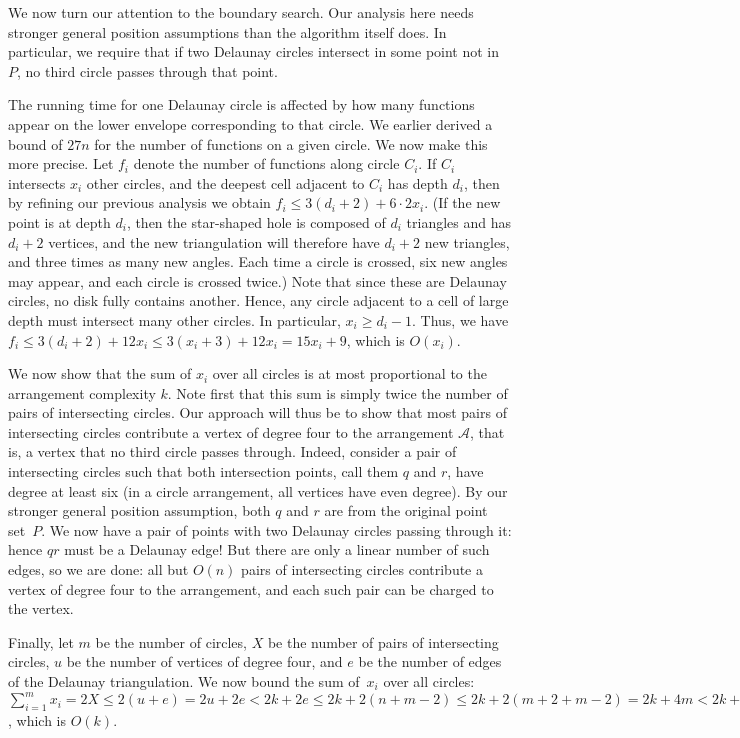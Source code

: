 \documentclass{cccg13}
\newcommand\arr{\mathcal A}
\begin{document}
We now turn our attention to the boundary search.  Our analysis here needs stronger general position assumptions than the algorithm itself does.  In particular, we require that if two Delaunay circles intersect in some point not in $P$, no third circle passes through that point.

The running time for one Delaunay circle is affected by how many functions appear on the lower envelope corresponding to that circle.  We earlier derived a bound of $27n$ for the number of functions on a given circle.  We now make this more precise.  Let $f_i$ denote the number of functions along circle $C_i$.  If $C_i$ intersects $x_i$ other circles, and the deepest cell adjacent to $C_i$ has depth $d_i$, then by refining our previous analysis we obtain
$f_i \le 3(d_i+2)+6\cdot 2x_i$.  (If the new point is at depth $d_i$, then the star-shaped hole is composed of $d_i$ triangles and has $d_i+2$ vertices, and the new triangulation will therefore have $d_i+2$ new triangles, and three times as many new angles.  Each time a circle is crossed, six new angles may appear, and each circle is crossed twice.)  Note that since these are Delaunay circles, no disk fully contains another.  Hence, any circle adjacent to a cell of large depth must intersect many other circles.  In particular, $x_i \ge d_i - 1$.  Thus, we have
$f_i \le 3(d_i + 2) + 12x_i \le 3(x_i + 3) + 12x_i = 15x_i+9$, which is $O(x_i)$.

We now show that the sum of $x_i$ over all circles is at most proportional to the arrangement complexity $k$.  Note first that this sum is simply twice the number of pairs of intersecting circles.  Our approach will thus be to show that most pairs of intersecting circles contribute a vertex of degree four to the arrangement $\arr$, that is, a vertex that no third circle passes through.  Indeed, consider a pair of intersecting circles such that both intersection points, call them $q$ and $r$, have degree at least six (in a circle arrangement, all vertices have even degree).  By our stronger general position assumption, both $q$ and $r$ are from the original point set~$P$.  We now have a pair of points with two Delaunay circles passing through it: hence $qr$ must be a Delaunay edge!  But there are only a linear number of such edges, so we are done: all but $O(n)$ pairs of intersecting circles contribute a vertex of degree four to the arrangement, and each such pair can be charged to the vertex.

Finally, let $m$ be the number of circles, $X$ be the number of pairs of intersecting circles, $u$ be the number of vertices of degree four, and $e$ be the number of edges of the Delaunay triangulation.  We now bound the sum of~$x_i$ over all circles:
$\sum_{i=1}^m x_i = 2X \le 2(u + e) = 2u + 2e < 2k + 2e \le 2k + 2(n+m-2) \le
2k + 2(m+2+m-2) = 2k + 4m < 2k + 4k = 6k$,
which is $O(k)$.
\end{document}
